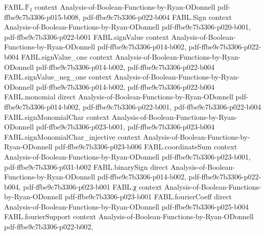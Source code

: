 \begin{theorem}
\label{FABL.restrictedFourierWeight_gt_quarter_of_mem_goldreichLevinRetained}
\leanok
{}
\proofstep
  {FABL.𝔽₂}
  {context}
  {Analysis-of-Boolean-Functions-by-Ryan-ODonnell}
  {pdf-ffbe9c7b3306-p015-b008,
    pdf-ffbe9c7b3306-p022-b004}
\proofstep
  {FABL.Sign}
  {context}
  {Analysis-of-Boolean-Functions-by-Ryan-ODonnell}
  {pdf-ffbe9c7b3306-p020-b001,
    pdf-ffbe9c7b3306-p022-b001}
\proofstep
  {FABL.signValue}
  {context}
  {Analysis-of-Boolean-Functions-by-Ryan-ODonnell}
  {pdf-ffbe9c7b3306-p014-b002,
    pdf-ffbe9c7b3306-p022-b004}
\proofstep
  {FABL.signValue_one}
  {context}
  {Analysis-of-Boolean-Functions-by-Ryan-ODonnell}
  {pdf-ffbe9c7b3306-p014-b002,
    pdf-ffbe9c7b3306-p022-b004}
\proofstep
  {FABL.signValue_neg_one}
  {context}
  {Analysis-of-Boolean-Functions-by-Ryan-ODonnell}
  {pdf-ffbe9c7b3306-p014-b002,
    pdf-ffbe9c7b3306-p022-b004}
\proofstep
  {FABL.monomial}
  {direct}
  {Analysis-of-Boolean-Functions-by-Ryan-ODonnell}
  {pdf-ffbe9c7b3306-p014-b002,
    pdf-ffbe9c7b3306-p022-b001,
    pdf-ffbe9c7b3306-p022-b004}
\proofstep
  {FABL.signMonomialChar}
  {context}
  {Analysis-of-Boolean-Functions-by-Ryan-ODonnell}
  {pdf-ffbe9c7b3306-p023-b001,
    pdf-ffbe9c7b3306-p023-b004}
\proofstep
  {FABL.signMonomialChar_injective}
  {context}
  {Analysis-of-Boolean-Functions-by-Ryan-ODonnell}
  {pdf-ffbe9c7b3306-p023-b006}
\proofstep
  {FABL.coordinateSum}
  {context}
  {Analysis-of-Boolean-Functions-by-Ryan-ODonnell}
  {pdf-ffbe9c7b3306-p023-b001,
    pdf-ffbe9c7b3306-p031-b002}
\proofstep
  {FABL.binarySign}
  {direct}
  {Analysis-of-Boolean-Functions-by-Ryan-ODonnell}
  {pdf-ffbe9c7b3306-p014-b002,
    pdf-ffbe9c7b3306-p022-b004,
    pdf-ffbe9c7b3306-p023-b001}
\proofstep
  {FABL.χ}
  {context}
  {Analysis-of-Boolean-Functions-by-Ryan-ODonnell}
  {pdf-ffbe9c7b3306-p023-b001}
\proofstep
  {FABL.fourierCoeff}
  {direct}
  {Analysis-of-Boolean-Functions-by-Ryan-ODonnell}
  {pdf-ffbe9c7b3306-p025-b004}
\proofstep
  {FABL.fourierSupport}
  {context}
  {Analysis-of-Boolean-Functions-by-Ryan-ODonnell}
  {pdf-ffbe9c7b3306-p022-b002,
}
\end{theorem}
